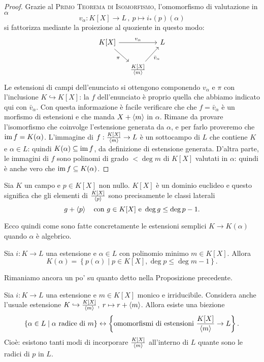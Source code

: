 \begin{proof}
Grazie al {\scshape Primo Teorema di Isomorfismo}, l'omomorfismo di valutazione in \(\alpha\)
\[v_\alpha : K[X] \to L \,,\ p \mapsto i_\ast (p)(\alpha)\]
si fattorizza mediante la proiezione al quoziente in questo modo:
\[\begin{tikzcd}[column sep=small]
K[X] \ar["\pi", dr, swap] \ar["{v_\alpha}", rr] & & L \\
& \frac{K[X]}{\gen m} \ar["{\bar v_\alpha}", ur, swap]
\end{tikzcd}\]
Le estensioni di campi dell'enunciato si ottengono componendo \(v_\alpha\) e \(\pi\) con l'inclusione \(K \hookrightarrow K[X]\): la \(f\) dell'enunciato è proprio quella che abbiamo indicato qui con \(\bar v_\alpha\). Con questa informazione è facile verificare che che \(f = \bar v_\alpha\) è un morfismo di estensioni e che manda \(X + \left\langle m\right\rangle\) in \(\alpha\).\newline
Rimane da provare l'isomorfismo che coinvolge l'estensione generata da \(\alpha\), e per farlo proveremo che \(\operatorname{im} f = K(\alpha)\). L'immagine di \(f : \frac{K[X]}{\left\langle m\right\rangle} \to L\) è un sottocampo di \(L\) che contiene \(K\) e \(\alpha \in L\): quindi \(K(\alpha) \subseteq \operatorname{im} f\), da definizione di estensione generata. D'altra parte, le immagini di \(f\) sono polinomi di grado \(< \deg m\) di \(K[X]\) valutati in \(\alpha\): quindi è anche vero che \(\operatorname{im} f \subseteq K(\alpha)\).
\end{proof}

\begin{rich}
Sia \(K\) un campo e \(p \in K[X]\) non nullo. \(K[X]\) è un dominio euclideo e questo significa che gli elementi di \(\frac{K[X]}{\left\langle p\right\rangle}\) sono precisamente le classi laterali
\[g + \left\langle p\right\rangle \quad\text{con } g \in K[X] \text{ e } \deg g \le \deg p -1 .\]
\end{rich}

Ecco quindi come sono fatte concretamente le estensioni semplici \(K \to K(\alpha)\) quando \(\alpha\) è algebrico.

\begin{coro}\label{coro:KAlgebricoEsplicito}
Sia \(i : K \to L\) una estensione e \(\alpha \in L\) con polinomio minimo \(m \in K[X]\). Allora
\[K(\alpha) = \left\{ p(\alpha) \mid p \in K[X], \deg p \le \deg m -1 \right\} .\]
\end{coro}

Rimaniamo ancora un po' su quanto detto nella Proposizione precedente.

\begin{coro}
Sia \(i : K \to L\) una estensione e \(m \in K[X]\) monico e irriducibile. Considera anche l'usuale estensione \(K \hookrightarrow \frac{K[X]}{\left\langle m\right\rangle}\), \(r \mapsto r + \left\langle m\right\rangle\). Allora esiste una biezione
\[\{\alpha \in L \mid \alpha \text{ radice di } m\} \leftrightarrow \left\{\text{omomorfismi di estensioni } \frac{K[X]}{\left\langle m\right\rangle} \to L\right\} .\]
Cioè: esistono tanti modi di incorporare \(\frac{K[X]}{\left\langle m\right\rangle}\) all'interno di \(L\) quante sono le radici di \(p\) in \(L\).
\end{coro}

